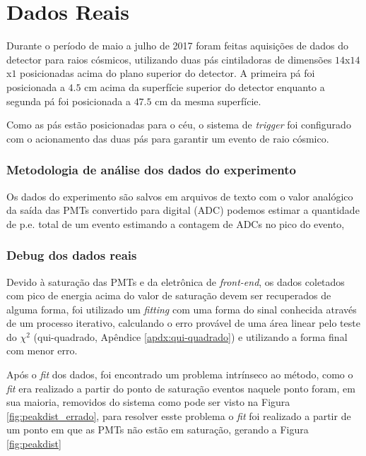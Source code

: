 \chapter{Dados Reais} \label{cap:dadosreais}
\vspace{-2cm}

Durante o período de maio a julho de 2017 foram feitas aquisições de dados do detector para raios cósmicos, utilizando duas pás cintiladoras de dimensões $14$x$14$x$1$ posicionadas acima do plano superior do detector. A primeira pá foi posicionada a $4.5$ cm acima da superfície superior do detector enquanto a segunda pá foi posicionada a $47.5$ cm da mesma superfície.

Como as pás estão posicionadas para o céu, o sistema de \emph{trigger} foi configurado com o acionamento das duas pás para garantir um evento de raio cósmico.



\subsection{Metodologia de análise dos dados do experimento}

Os dados do experimento são salvos em arquivos de texto com o valor analógico da saída das PMTs convertido para digital (\ac{ADC}) podemos estimar a quantidade de \ac{p.e.} total de um evento estimando a contagem de ADCs no pico do evento, 


\subsection{Debug dos dados reais}

Devido à saturação das PMTs e da eletrônica de \emph{front-end}, os dados coletados com pico de energia acima do valor de saturação devem ser recuperados de alguma forma, foi utilizado um \emph{fitting} com uma forma do sinal conhecida através de um processo iterativo, calculando o erro provável de uma área linear pelo teste do $\chi^2$ (qui-quadrado, Apêndice \ref{apdx:qui-quadrado}) e utilizando a forma final com menor erro.

Após o \emph{fit} dos dados, foi encontrado um problema intrínseco ao método, como o \emph{fit} era realizado a partir do ponto de saturação eventos naquele ponto foram, em sua maioria, removidos do sistema como pode ser visto na Figura \ref{fig:peakdist_errado},  para resolver esste problema o \emph{fit} foi realizado a  partir de um ponto em que as PMTs não estão em saturação, gerando a Figura \ref{fig:peakdist}

